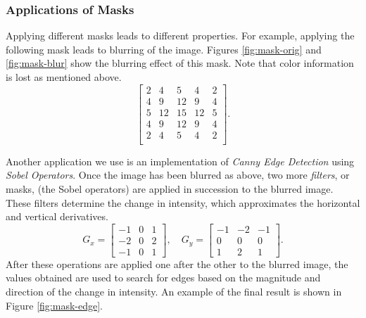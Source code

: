 \documentclass[addpoints]{exam}
\begin{document}
  \subsubsection{Applications of Masks}

  Applying different masks leads to different properties. For example, applying the following mask leads to blurring of the image. Figures \ref{fig:mask-orig} and \ref{fig:mask-blur} show the blurring effect of this mask. Note that color information is lost as mentioned above.
  \[
    \left[
      \begin{array}{ccccc}
        2 & 4 & 5 & 4 & 2\\
        4 & 9 & 12 & 9 & 4\\
        5 & 12 & 15 & 12 & 5\\
        4 & 9 & 12 & 9 & 4\\
        2 & 4 & 5 & 4 & 2\\
      \end{array}          
    \right].
  \]

  Another application we use is an implementation of \textit{Canny Edge Detection} using \textit{Sobel Operators}. Once the image has been blurred as above, two more \textit{filters}, or masks, (the Sobel operators) are applied in succession to the blurred image. These filters determine the change in intensity, which approximates the horizontal and vertical derivatives.
  \[
    G_x =   \left[
      \begin{array}{ccc}
        -1 & 0 & 1\\
        -2 & 0 & 2\\
        -1 & 0 & 1
      \end{array}
    \right], \quad
    G_y =   \left[
      \begin{array}{ccc}
        -1 & -2 & -1\\
        0 & 0 & 0\\
        1 & 2 & 1
      \end{array}    
    \right].
  \]
  After these operations are applied one after the other to the blurred image, the values obtained are used to search for edges based on the magnitude and direction of the change in intensity. An example of the final result is shown in Figure \ref{fig:mask-edge}.
\end{document}
